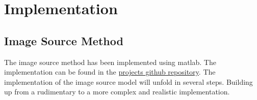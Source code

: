 \chapter{Implementation}
\label{chap:implementation}
\section{Image Source Method}
The image source method has been implemented using matlab. The implementation can be found in the \color{blue}\href{https://github.com/leonardberresheim/MA---Active-Noise-Control-in-Spatial-Domains/tree/main/Matlab/Image_Source_Method/ISM}{projects github repository}.\color{black}
\newpage
The implementation of the image source model will unfold in several steps. Building up from a rudimentary to a more complex and realistic implementation.
